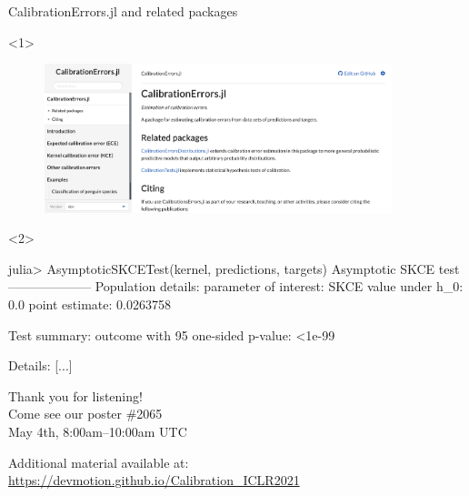 \documentclass[aspectratio=169,hyperref={pdfpagelabels=false,pageanchor=false,bookmarks=false}]{beamer}
\begin{document}
\begin{frame}[fragile]{CalibrationErrors.jl and related packages}
  \begin{onlyenv}<1>
    \begin{figure}
      \includegraphics[width=0.9\textwidth]{figures/calibrationerror.png}
    \end{figure}
  \end{onlyenv}
  \begin{onlyenv}<2>
    \begin{juliaconsnippet}
julia> AsymptoticSKCETest(kernel, predictions, targets)
Asymptotic SKCE test
--------------------
Population details:
    parameter of interest:   SKCE
    value under h_0:         0.0
    point estimate:          0.0263758

Test summary:
    outcome with 95%
    one-sided p-value:           <1e-99

Details:
[...]
\end{juliaconsnippet}
\end{onlyenv}
\end{frame}

\begin{frame}[standout]
  \vspace*{2\baselineskip}
	Thank you for listening!\\[2\baselineskip]
  Come see our poster \#2065\\
  May 4th, 8:00am--10:00am UTC
  \vspace*{2\baselineskip}
	\begin{flushleft}
    \normalsize
    Additional material available at:\\
    \url{https://devmotion.github.io/Calibration\_ICLR2021}
	\end{flushleft}
\end{frame}
\end{document}
